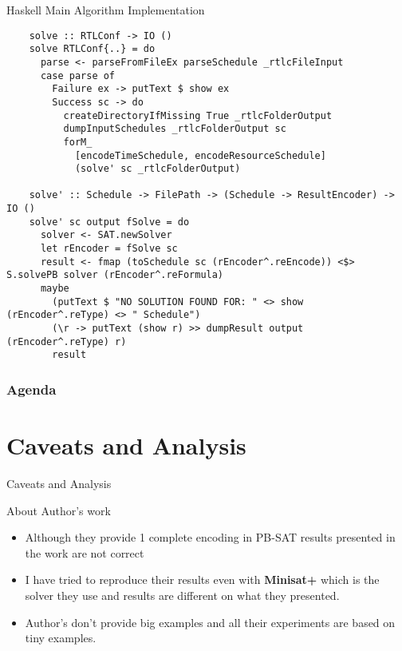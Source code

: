 \documentclass{beamer}
\begin{document}
\begin{frame}[fragile]{Haskell Main Algorithm Implementation}

  \begin{verbatim}
    solve :: RTLConf -> IO ()
    solve RTLConf{..} = do
      parse <- parseFromFileEx parseSchedule _rtlcFileInput
      case parse of
        Failure ex -> putText $ show ex
        Success sc -> do
          createDirectoryIfMissing True _rtlcFolderOutput
          dumpInputSchedules _rtlcFolderOutput sc
          forM_ 
            [encodeTimeSchedule, encodeResourceSchedule]
            (solve' sc _rtlcFolderOutput)
    
    solve' :: Schedule -> FilePath -> (Schedule -> ResultEncoder) -> IO ()
    solve' sc output fSolve = do
      solver <- SAT.newSolver
      let rEncoder = fSolve sc
      result <- fmap (toSchedule sc (rEncoder^.reEncode)) <$> S.solvePB solver (rEncoder^.reFormula)
      maybe 
        (putText $ "NO SOLUTION FOUND FOR: " <> show (rEncoder^.reType) <> " Schedule") 
        (\r -> putText (show r) >> dumpResult output (rEncoder^.reType) r)
        result
  \end{verbatim}

\end{frame}

\begin{frame}
  \frametitle{Agenda}
  \section{Caveats and Analysis}
  \tableofcontents[currentsection]
\end{frame}

\begin{frame}[fragile]{Caveats and Analysis}
  \begin{block}{About Author's work}
    \begin{itemize}
      \item Although they provide 1 complete encoding in PB-SAT results presented in the work are not correct
      \item I have tried to reproduce their results even with \textbf{Minisat+} which is the solver they use and results are different on what they presented.
      \item Author's don't provide big examples and all their experiments are based on tiny examples.
  \end{itemize}
  \end{block}
\end{frame}
\end{document}
